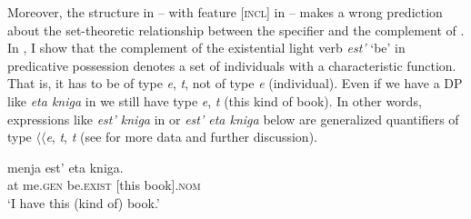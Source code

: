\documentclass[output=paper,colorlinks,citecolor=brown,modfonts,nonflat]{langsci/langscibook}
\begin{document}
Moreover, the structure in  – with feature [\textsc{incl}] in {\liv} – makes a wrong prediction about the set-theoretic relationship between the specifier and the complement of {\liv}. In \citet{TsedrykInPress}, I show that the complement of the existential light verb \textit{est’} ‘be’ in predicative possession denotes a set of individuals with a characteristic function. That is, it has to be of type {\textlangle}\textit{e}, \textit{t}{\textrangle}, not of type {\textlangle}\textit{e}{\textrangle} (individual). Even if we have a DP like \textit{eta kniga} in  we still have type {\textlangle}\textit{e}, \textit{t}{\textrangle} (this kind of book). In other words, expressions like \textit{est’ kniga} in  or \textit{est’ eta kniga} below are generalized quantifiers of type ${\langle}{\langle}$\textit{e}, \textit{t}{\textrangle}, \textit{t}{\textrangle} (see \citealt{TsedrykInPress} for more data and further discussion).

\ea%
    \label{ex:tsedryk:9}
     {menja}     {est’}           {eta} {kniga.}\\
            at me.\textsc{gen}   be.\textsc{exist}   [this book].\textsc{nom}\\
    \glt    ‘I have this (kind of) book.’
    \z
\end{document}
